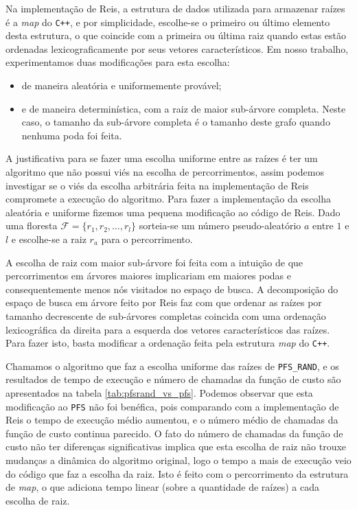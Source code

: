 \documentclass[12pt]{article}
\newcommand{\toolname}[1]{\textit{#1}}
\newcommand{\algname}[1]{\texttt{#1}}
\newcommand{\langname}[1]{\texttt{#1}}
\newcommand{\forest}{\mathcal{F}}
\begin{document}
Na implementação de Reis, a estrutura de dados utilizada para armazenar
raízes é a \toolname{map} do \langname{C++}, e por simplicidade, 
escolhe-se o primeiro ou último elemento desta estrutura, o que coincide
com a primeira ou última raiz quando estas estão ordenadas 
lexicograficamente por seus vetores característicos. Em nosso trabalho, 
experimentamos duas modificações para esta escolha:
\begin{itemize}
    \item{de maneira aleatória e uniformemente provável;}
    \item{e de maneira determinística, com a raiz de maior sub-árvore
          completa. Neste caso, o tamanho da sub-árvore completa é o 
          tamanho deste grafo quando nenhuma poda foi feita.}
\end{itemize}

A justificativa para se fazer uma escolha uniforme entre as raízes é
ter um algoritmo que não possui viés na escolha de percorrimentos, assim 
podemos investigar se o viés da escolha arbitrária feita na 
implementação de Reis compromete a execução do algoritmo. Para fazer a 
implementação da escolha aleatória e 
uniforme fizemos uma pequena modificação ao código de Reis. Dado uma 
floresta $\forest = \{r_1, r_2, \dots, r_l\}$ sorteia-se um número 
pseudo-aleatório $a$ entre $1$ e $l$ e escolhe-se a raiz $r_a$ para o 
percorrimento.

A escolha de raiz com maior sub-árvore foi feita com a intuição de que
percorrimentos em árvores maiores implicariam em maiores podas e 
consequentemente menos nós visitados no espaço de busca. A decomposição
do espaço de busca em árvore feito por Reis faz com que ordenar as 
raízes por tamanho decrescente de sub-árvores completas coincida com 
uma ordenação lexicográfica da direita para a esquerda dos vetores 
característicos das raízes. Para fazer isto, basta modificar a 
ordenação feita pela estrutura \toolname{map} do \langname{C++}.

Chamamos o algoritmo que faz a escolha uniforme das raízes de 
\algname{PFS\_RAND}, e os resultados de tempo de execução e número
de chamadas da função de custo são apresentados na tabela 
\ref{tab:pfsrand_vs_pfs}. Podemos observar que esta modificação ao 
\algname{PFS} não foi benéfica, pois comparando com a implementação de 
Reis o tempo de execução médio aumentou, e o número médio de chamadas da 
função de custo continua parecido. O fato do número de chamadas da 
função de custo não ter diferenças significativas implica que esta 
escolha de raiz não trouxe mudanças a dinâmica do algoritmo original, 
logo o tempo a mais de execução veio do código que faz a escolha da 
raiz. Isto é feito com o percorrimento da estrutura de \toolname{map}, 
o que adiciona tempo linear (sobre a quantidade de raízes) a cada 
escolha de raiz.
\end{document}
